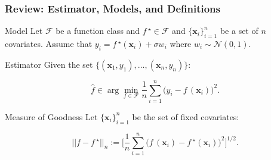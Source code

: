 \documentclass[11pt]{beamer}
\newcommand{\bx}{\mathbf{x}}
\newcommand{\cF}{\mathcal{F}}
\newcommand{\fstar}{f\,^\star}
\newcommand{\fhat}{\widehat{f}}
\begin{document}
	\begin{frame}
		\frametitle{Review: Estimator, Models, and Definitions}
		\begin{block}{Model}
			Let $\cF$ be a function class and $\fstar \in \cF$ and $\{\bx_i\}_{i = 1}^{n}$ be a set of $n$ covariates. Assume that $y_i = \fstar(\bx_i) + \sigma w_i$ where $w_i \sim \mathcal{N}(0, 1)$.
		\end{block}
		\begin{block}{Estimator}
			Given the set $\{(\bx_1, y_1), \dots, (\bx_n, y_n) \}$:
			\begin{small}
			\vspace{-0.2cm}
			\begin{equation*}
				\fhat \in \arg\min_{f\in\cF} \frac{1}{n} \sum_{i = 1}^{n} \Big(y_i - f\,(\bx_i)\Big)^2.
			\end{equation*}
			\vspace{-0.3cm}
			\end{small}
		\end{block}
		\begin{block}{Measure of Goodness}
			Let $\{\bx_i\}_{i = 1}^{n}$ be the set of fixed covariates:
			\vspace{-0.3cm}
			\begin{small}
				\begin{equation*}
				||f-\fstar||_n := \Bigg[\frac{1}{n}\sum_{i = 1}^n \big(f\,(\bx_i) - \fstar(\bx_i)\big)^2\Bigg]^{1/2}.
				\end{equation*}
			\end{small}			
			\vspace{-0.3cm}
		\end{block}
	\end{frame}
	
\end{document}
